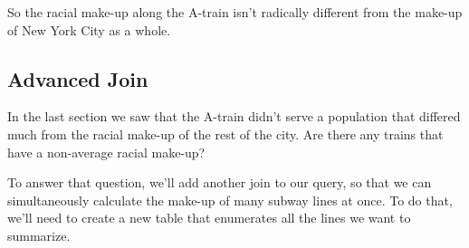 \documentclass[a4paper,11pt,english]{sphinxmanual}
\begin{document}
So the racial make-up along the A-train isn’t radically different from the make-up of New York City as a whole.


\subsection{Advanced Join}
\label{\detokenize{basic:advanced-join}}
In the last section we saw that the A-train didn’t serve a population that differed much from the racial make-up of the rest of the city. Are there any trains that have a non-average racial make-up?

To answer that question, we’ll add another join to our query, so that we can simultaneously calculate the make-up of many subway lines at once. To do that, we’ll need to create a new table that enumerates all the lines we want to summarize.

\begin{sphinxVerbatim}[commandchars=\\\{\}]
      
    
\end{sphinxVerbatim}
\end{document}
